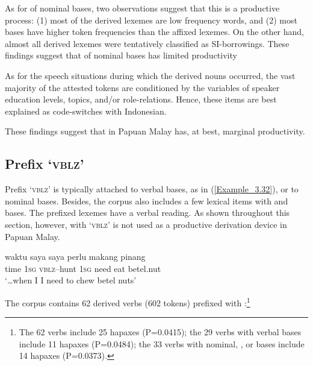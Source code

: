 As for  of nominal bases, two observations suggest that this is a productive process: (1) most of the derived lexemes are low frequency words, and (2) most bases have higher token frequencies than the affixed lexemes. On the other hand, almost all derived lexemes were tentatively classified as SI-borrowings. These findings suggest that  of nominal bases has limited productivity



As for the speech situations during which the derived nouns occurred, the vast majority of the attested tokens are conditioned by the variables of speaker education levels, topics, and/or role-relations. Hence, these items are best explained as code-switches with Indonesian.


\largerpage[2]
These findings suggest that in Papuan Malay   has, at best, margin\-al productivity.


\subsection[Prefix {\BER}- ‘\textsc{vblz}’]{Prefix  ‘\textsc{vblz}’}\label{Para_3.1.5}

Prefix  ‘\textsc{vblz}’ is typically attached to verbal bases, as in (\ref{Example_3.32}), or to nominal bases. Besides, the corpus also includes a few lexical items with  and  bases. The prefixed lexemes have a verbal reading. As shown throughout this section, however,  with  ‘\textsc{vblz}’ is not used as a productive derivation device in Papuan Malay.

\ea
\label{Example_3.32}
\gll {\ldots} {waktu} {saya} {} {saya} {perlu} {makang} {pinang}\\ %
 { }  time  \textsc{1sg}  \textsc{vblz}–hunt  \textsc{1sg}  need  eat  betel.nut\\
\glt 
‘\ldots when I  I need to chew betel nuts’ \textstyleExampleSource{[080919-004-NP.0011]}
\z



The corpus contains 62 derived verbs (602 tokens) prefixed with :\footnote{The 62 verbs include 25 hapaxes (P=0.0415); the 29 verbs with verbal bases include 11 hapaxes (P=0.0484); the 33 verbs with nominal, , or  bases include 14 hapaxes (P=0.0373).}



